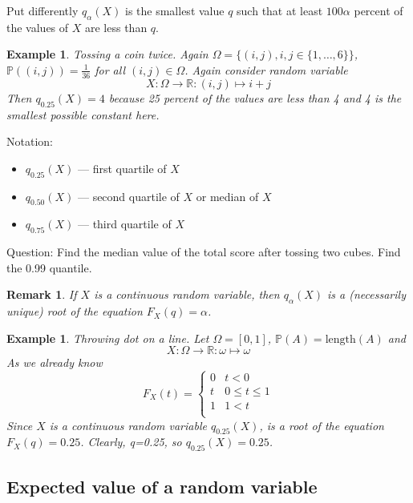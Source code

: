 \documentclass[12pt]{article}
\newtheorem{remark}[theorem]{Remark}
\newtheorem{example}[theorem]{Example}
\begin{document}
Put differently $q_\alpha(X)$ is the smallest value $q$ such that at least
$100\alpha$ percent of the values of $X$ are less than $q$.

\begin{example} Tossing a coin twice. Again $\Omega=\{(i,j),
        i,j\in \{1,\ldots,6\} \}$, $\mathbb{P}((i,j))=\frac{1}{36}$ for all
    $(i,j)\in \Omega$. Again consider random variable
    $$
        X:\Omega\to\mathbb{R}:(i,j)\mapsto i+j
    $$
    Then $q_{0.25}(X)=4$ because 25 percent of the values are less than 4 and 4
    is the smallest possible constant here.
\end{example}

Notation:
\begin{itemize}
    \item $q_{0.25}(X)$ --- first quartile of $X$
    \item $q_{0.50}(X)$ --- second quartile of $X$ or median of $X$
    \item $q_{0.75}(X)$ --- third quartile of $X$
\end{itemize}

Question: Find the median value of the total score after tossing two cubes. Find
the 0.99 quantile.

\begin{remark} If $X$ is a continuous random variable, then $q_\alpha(X)$ is a
    (necessarily unique) root of the equation $F_X(q)=\alpha$.
\end{remark}

\begin{example} Throwing dot on a line. Let $\Omega=[0,1]$,
    $\mathbb{P}(A)=\mbox{length}(A)$ and
    $$
        X:\Omega\to\mathbb{R}:\omega\mapsto \omega
    $$
    As we already know
    $$
        F_X(t)
        =\begin{cases}
            0 & t < 0          \\
            t & 0\leq t \leq 1 \\
            1 & 1 < t          \\
        \end{cases}
    $$
    Since $X$ is a continuous random variable $q_{0.25}(X)$, is a root of the
    equation $F_X(q)=0.25$. Clearly, q=0.25, so $q_{0.25}(X)=0.25$.
\end{example}


\subsection{Expected value of a random variable}
\end{document}
